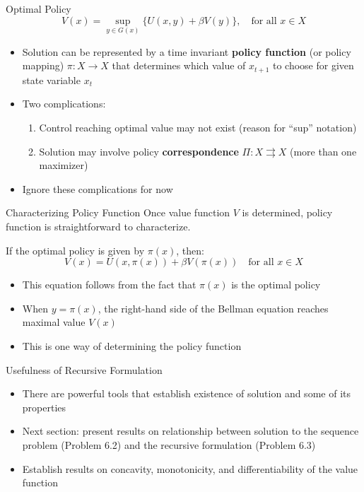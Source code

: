 \documentclass[9pt,aspectratio=169]{beamer}
\begin{document}
\begin{frame}{Optimal Policy}
$$V(x) = \sup_{y \in G(x)} \{U(x,y) + \beta V(y)\}, \quad \text{for all } x \in X$$
\begin{itemize}
    \item Solution can be represented by a time invariant \textbf{policy
      function} (or policy mapping) $\pi: X \to X$ that determines which
    value of $x_{t+1}$ to choose for given state variable $x_t$
    \item Two complications:
    \begin{enumerate}
        \item Control reaching optimal value may not exist (reason for ``sup'' notation)
        \item Solution may involve policy \textbf{correspondence} $\Pi: X \rightrightarrows X$ (more than one maximizer)
    \end{enumerate}
    \item Ignore these complications for now
\end{itemize}
\end{frame}

\begin{frame}{Characterizing Policy Function}
    Once value function $V$ is determined, policy function is straightforward
    to characterize.

    If the optimal policy is given by $\pi(x)$, then:
    $$V(x) = U(x, \pi(x)) + \beta V(\pi(x)) \quad \text{for all } x \in X$$

    \begin{itemize}
        \item This equation follows from the fact that $\pi(x)$ is the
        optimal policy
        \item When $y = \pi(x)$, the right-hand side of the Bellman equation
        reaches maximal value $V(x)$
        \item This is one way of determining the policy function
    \end{itemize}
\end{frame}

\begin{frame}{Usefulness of Recursive Formulation}
\begin{itemize}
    \item There are powerful tools that establish existence of solution and
    some of its properties
    \item Next section: present results on relationship between solution to
    the sequence problem (Problem 6.2) and the recursive formulation (Problem
    6.3)
    \item Establish results on concavity, monotonicity, and differentiability
    of the value function
\end{itemize}
\end{frame}
\end{document}
